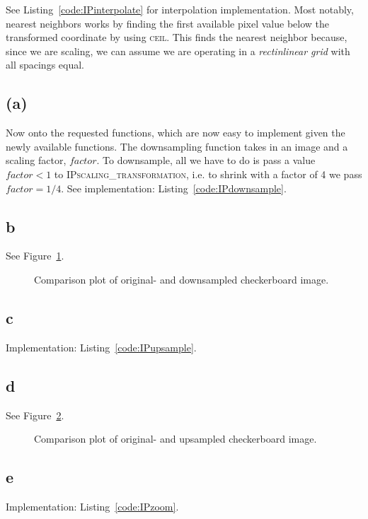\documentclass{article}
\begin{document}
 See Listing~\ref{code:IPinterpolate} for interpolation implementation. Most notably, nearest neighbors works by finding the first available pixel value below the transformed coordinate by using \textsc{ceil}. This finds the nearest neighbor because, since we are scaling, we can assume we are operating in a \textit{rectinlinear grid} with all spacings equal.

\subsection*{(a)} Now onto the requested functions, which are now easy to implement given the newly available functions. The downsampling function takes in an image and a scaling factor, $factor$. To downsample, all we have to do is pass a value $factor < 1$ to \textsc{IPscaling\_transformation}, i.e. to shrink with a factor of 4 we pass $factor = 1/4$. See implementation: Listing~\ref{code:IPdownsample}.


\subsection*{b} See Figure~\ref{fig:downsampling}.
\begin{figure}[ht]
    \centering
    
    \caption{Comparison plot of original- and downsampled checkerboard image.}
    \label{fig:downsampling}
\end{figure}

\subsection*{c}  Implementation: Listing~\ref{code:IPupsample}.

\subsection*{d} See Figure~\ref{fig:upsampling}.
\begin{figure}[ht]
    \centering
    
    \caption{Comparison plot of original- and upsampled checkerboard image.}
    \label{fig:upsampling}
\end{figure}

\subsection*{e}  Implementation: Listing~\ref{code:IPzoom}.
\end{document}
